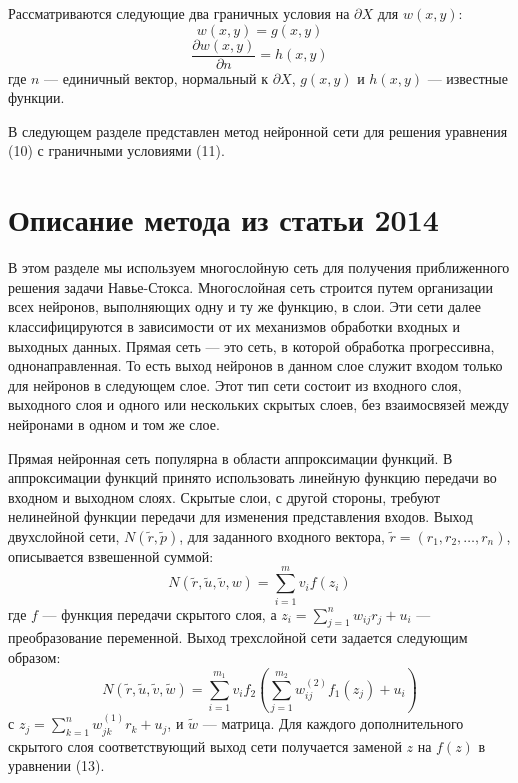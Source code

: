 \documentclass[a4paper,12pt]{article}
\theoremstyle{plain} %
\theoremstyle{definition} %
\theoremstyle{remark} %
\begin{document}
Рассматриваются следующие два граничных условия на $\partial X$ для $w(x, y)$:
\begin{equation}
w(x, y) = g(x, y)
\end{equation}
\begin{equation}
\frac{\partial w(x, y)}{\partial n} = h(x, y)
\end{equation}
где $n$ — единичный вектор, нормальный к $\partial X$, $g(x, y)$ и $h(x, y)$ — известные функции.

В следующем разделе представлен метод нейронной сети для решения уравнения (10) с граничными условиями (11).

\section{Описание метода из статьи 2014}
В этом разделе мы используем многослойную сеть для получения приближенного решения задачи Навье-Стокса. Многослойная сеть строится путем организации всех нейронов, выполняющих одну и ту же функцию, в слои. Эти сети далее классифицируются в зависимости от их механизмов обработки входных и выходных данных. Прямая сеть — это сеть, в которой обработка прогрессивна, однонаправленная. То есть выход нейронов в данном слое служит входом только для нейронов в следующем слое. Этот тип сети состоит из входного слоя, выходного слоя и одного или нескольких скрытых слоев, без взаимосвязей между нейронами в одном и том же слое.

Прямая нейронная сеть популярна в области аппроксимации функций. В аппроксимации функций принято использовать линейную функцию передачи во входном и выходном слоях. Скрытые слои, с другой стороны, требуют нелинейной функции передачи для изменения представления входов. Выход двухслойной сети, $N(\tilde{r}, \tilde{p})$, для заданного входного вектора, $\tilde{r} = (r_1, r_2, \ldots, r_n)$, описывается взвешенной суммой:
\begin{equation}
N(\tilde{r}, \tilde{u}, \tilde{v}, w) = \sum_{i=1}^{m} v_i f(z_i)
\end{equation}
где $f$ — функция передачи скрытого слоя, а $z_i = \sum_{j=1}^{n} w_{ij} r_j + u_i$ — преобразование переменной. Выход трехслойной сети задается следующим образом:
\begin{equation}
N(\tilde{r}, \tilde{u}, \tilde{v}, \tilde{w}) = \sum_{i=1}^{m_1} v_i f_2 \left( \sum_{j=1}^{m_2} w_{ij}^{(2)} f_1(z_j) + u_i \right)
\end{equation}
с $z_j = \sum_{k=1}^{n} w_{jk}^{(1)} r_k + u_j$, и $\tilde{w}$ — матрица. Для каждого дополнительного скрытого слоя соответствующий выход сети получается заменой $z$ на $f(z)$ в уравнении (13).
\end{document}
